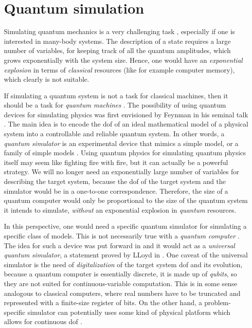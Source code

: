\section{Quantum simulation}
\label{sec:quantum_simulation}

Simulating quantum mechanics is a very challenging task \cite{manin1980computable, feynman1982simulation}, especially if one is interested in many-body systems.
The description of a state requires a large number of variables, for keeping track of all the quantum amplitudes, which grows exponentially with the system size.
Hence, one would have an \emph{exponential explosion} in terms of \emph{classical} resources (like for example computer memory), which clearly is not suitable.

If simulating a quantum system is not a task for classical machines, then it should be a task for \emph{quantum machines} \cite{feynman1982simulation, georgescu2014simulation, hauke2012simulators, kendon2010quantum, buluta2009simulators, cirac2012goals}.
The possibility of using quantum devices for simulating physics was first envisioned by Feynman in his seminal talk \cite{feynman1982simulation}.
The main idea is to encode the \ac{dof} of an ideal mathematical model of a physical system into a controllable and reliable quantum system.
In other words, a \emph{quantum simulator} is an experimental device that mimics a simple model, or a family of simple models \cite{hauke2012simulators}.
Using quantum physics for simulating quantum physics itself may seem like fighting fire with fire, but it can actually be a powerful strategy.
We will no longer need an exponentially large number of variables for describing the target system, because the \ac{dof} of the target system and the simulator would be in a one-to-one correspondence.
Therefore, the size of a quantum computer would only be proportional to the size of the quantum system it intends to simulate, \emph{without} an exponential explosion in \emph{quantum} resources.

In this perspective, one would need a specific quantum simulator for simulating a specific class of models.
This is not necessarily true with a \emph{quantum computer} \cite{feynman1985quantum, nielsen2010quantum, schleich2007elements, stolze2008quantum}.
The idea for such a device was put forward in \cite{manin1980computable, feynman1982simulation, feynman1985quantum} and it would act as a \emph{universal quantum simulator}, a statement proved by LLoyd in \cite{lloyd1996simulator}.
One caveat of the universal simulator is the need of \emph{digitalization} of the target system \ac{dof} and its evolution, because a quantum computer is essentially discrete, it is made up of \emph{qubits}, so they are not suited for continuous-variable computation.
This is in some sense analogous to classical computers, where real numbers have to be truncated and represented with a finite-size register of bits.
On the other hand, a problem-specific simulator can potentially uses some kind of physical platform which allows for continuous \ac{dof} \cite{kendon2010quantum, wagner2010continuous}.

